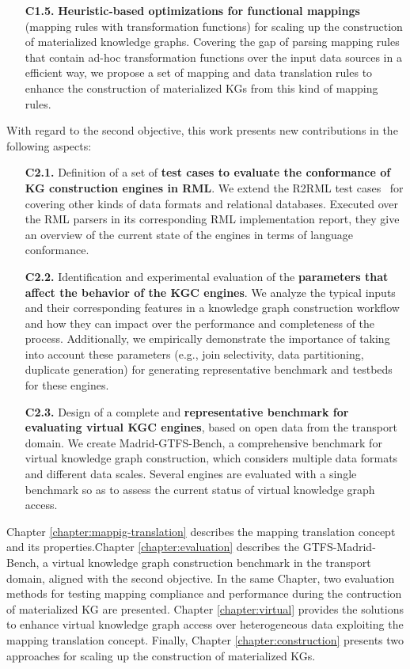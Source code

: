 \begin{enumerate}
    \item[\textbf{C1.5.}] \textbf{Heuristic-based optimizations for functional mappings} (mapping rules with transformation functions) for scaling up the construction of materialized knowledge graphs. Covering the gap of parsing mapping rules that contain ad-hoc transformation functions over the input data sources in a efficient way, we propose a set of mapping and data translation rules to enhance the construction of materialized KGs from this kind of mapping rules.
\end{enumerate}

With regard to the second objective, this work presents new contributions in the following aspects:
\begin{enumerate}
    \item[\textbf{C2.1.}] Definition of a set of \textbf{test cases to evaluate the conformance of KG construction engines in RML}. We extend the R2RML test cases~\citep{R2RML_test_cases} for covering other kinds of data formats and relational databases. Executed over the RML parsers in its corresponding RML implementation report, they give an overview of the current state of the engines in terms of language conformance.
    \item[\textbf{C2.2.}] Identification and experimental evaluation of the \textbf{parameters that affect the behavior of the KGC engines}. We analyze the typical inputs and their corresponding features in a knowledge graph construction workflow and how they can impact over the performance and completeness of the process. Additionally, we empirically demonstrate the importance of taking into account these parameters (e.g., join selectivity, data partitioning, duplicate generation) for generating representative benchmark and testbeds for these engines.
    \item[\textbf{C2.3.}] Design of a complete and \textbf{representative benchmark for evaluating virtual KGC engines}, based on open data from the transport domain. We create Madrid-GTFS-Bench, a comprehensive benchmark for virtual knowledge graph construction, which considers multiple data formats and different data scales. Several engines are evaluated with a single benchmark so as to assess the current status of virtual knowledge graph access.
\end{enumerate}

Chapter \ref{chapter:mappig-translation} describes the mapping translation concept and its properties.Chapter \ref{chapter:evaluation} describes the GTFS-Madrid-Bench, a virtual knowledge graph construction benchmark in the transport domain, aligned with the second objective. In the same Chapter, two evaluation methods for testing mapping compliance and performance during the contruction of materialized KG are presented. Chapter \ref{chapter:virtual} provides the solutions to enhance virtual knowledge graph access over heterogeneous data exploiting the mapping translation concept. Finally, Chapter \ref{chapter:construction} presents two approaches for scaling up the construction of materialized KGs. 


